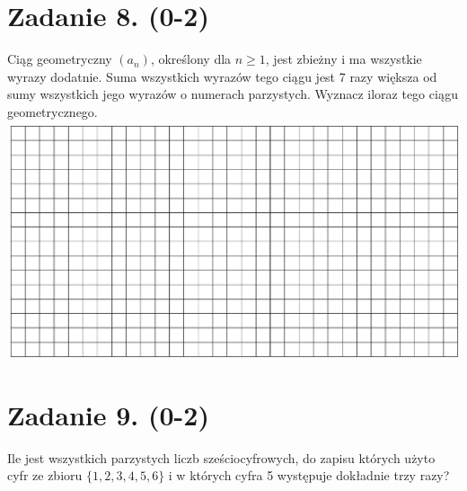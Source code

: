 \documentclass[10pt]{article}
\begin{document}
\section*{Zadanie 8. (0-2)}
Ciąg geometryczny \(\left(a_{n}\right)\), określony dla \(n \geqslant 1\), jest zbieżny i ma wszystkie wyrazy dodatnie. Suma wszystkich wyrazów tego ciągu jest 7 razy większa od sumy wszystkich jego wyrazów o numerach parzystych. Wyznacz iloraz tego ciągu geometrycznego.\\
\includegraphics[max width=\textwidth, center]{2024_11_21_8206013b40ecc9b11a30g-05}

\section*{Zadanie 9. (0-2)}
Ile jest wszystkich parzystych liczb sześciocyfrowych, do zapisu których użyto cyfr ze zbioru \(\{1,2,3,4,5,6\}\) i w których cyfra 5 występuje dokładnie trzy razy?
\end{document}
